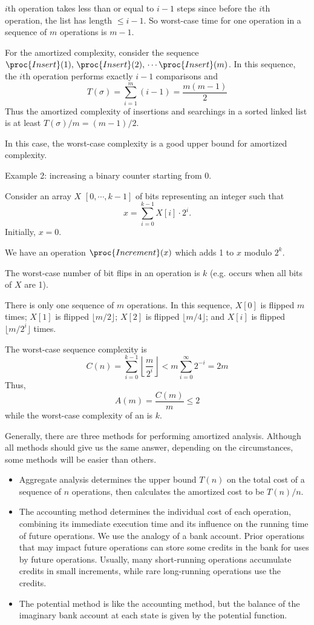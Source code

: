 $i$th operation takes less than or equal to $i-1$ steps since before the $i$th operation, the list has length $\leq i-1$. So worst-case time for one operation in a sequence of $m$ operations is $m-1$.

For the amortized complexity, consider the sequence $\proc{Insert}(1), \, \proc{Insert}(2),\, \cdots \proc{Insert}(m)$. In this sequence, the $i$th operation performs exactly $i-1$ comparisons and
$$
T(\sigma) = \sum_{i=1}^m (i-1) = \frac{m(m-1)}{2}
$$
Thus the amortized complexity of insertions and searchings in a sorted linked list is at least $T(\sigma)/m = (m-1)/2$.

In this case, the worst-case complexity is a good upper bound for amortized complexity.

Example 2: increasing a binary counter starting from 0.

Consider an array $X$ $[0,\cdots,k-1]$ of bits representing an integer such that
$$
x = \sum_{i=0}^{k-1} X[i]\cdot 2^i.
$$
Initially, $x=0$.

We have an operation $\proc{Increment}(x)$ which adds 1 to $x$ modulo $2^k$.

The worst-case number of bit flips in an  operation is $k$ (e.g. occurs when all bits of $X$ are 1).

There is only one sequence of $m$  operations. In this sequence, $X[0]$ is flipped $m$ times; $X[1]$ is flipped $\lfloor m/2 \rfloor$; $X[2]$ is flipped $\lfloor m/4 \rfloor$; and $X[i]$ is flipped $\lfloor m/2^i \rfloor$ times.

The worst-case sequence complexity is
$$
C(n) = \sum_{i=0}^{k-1} \left\lfloor \frac{m}{2^i} \right\rfloor < m \sum_{i=0}^\infty 2^{-i} = 2m
$$
Thus,
$$
A(m) = \frac{C(m)}{m} \leq 2
$$
while the worst-case complexity of an  is $k$.

Generally, there are three methods for performing amortized analysis. Although all methods should give us the same answer, depending on the circumstances, some methods will be easier than others.

\begin{itemize}
    \item Aggregate analysis determines the upper bound $T(n)$ on the total cost of a sequence of $n$
    operations, then calculates the amortized cost to be $T(n) / n$.
    \item The accounting method determines the individual cost of each operation, combining its immediate execution time and its influence on the running time of future operations. We use the analogy of a bank account. Prior operations that may impact future operations can store some credits in the bank for uses by future operations. Usually, many short-running operations accumulate credits in small increments, while rare long-running operations use the credits.
    \item The potential method is like the accounting method, but the balance of the imaginary bank account at each state is given by the potential function.
\end{itemize}

